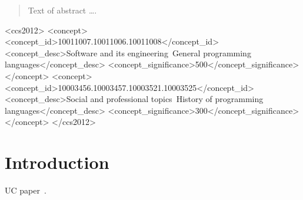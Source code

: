 \documentclass[acmsmall,review,anonymous]{acmart}\settopmatter{printfolios=true,printccs=false,printacmref=false}
\begin{document}
\begin{abstract}
Text of abstract \ldots.
\end{abstract}


\begin{CCSXML}
<ccs2012>
<concept>
<concept_id>10011007.10011006.10011008</concept_id>
<concept_desc>Software and its engineering~General programming languages</concept_desc>
<concept_significance>500</concept_significance>
</concept>
<concept>
<concept_id>10003456.10003457.10003521.10003525</concept_id>
<concept_desc>Social and professional topics~History of programming languages</concept_desc>
<concept_significance>300</concept_significance>
</concept>
</ccs2012>
\end{CCSXML}





\maketitle


\section{Introduction}

UC paper~\cite{canetti2001universally}. 
\end{document}
